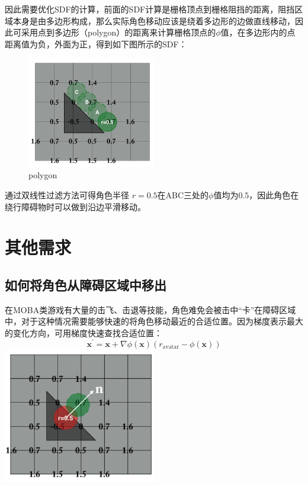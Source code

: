 因此需要优化SDF的计算，前面的SDF计算是栅格顶点到栅格阻挡的距离，阻挡区域本身是由多边形构成，那么实际角色移动应该是绕着多边形的边做直线移动，因此可采用点到多边形（polygon）的距离来计算栅格顶点的\(\phi\)值，在多边形内的点距离值为负，外面为正，得到如下图所示的SDF：

\begin{figure}
\centering
\includegraphics[width=0.5\textwidth,height=\textheight]{polygon.png}
\caption{polygon}
\end{figure}

通过双线性过滤方法可得角色半径
\(r = 0.5\)在ABC三处的\(\phi\)值均为\(0.5\)，因此角色在绕行障碍物时可以做到沿边平滑移动。

\hypertarget{ux5176ux4ed6ux9700ux6c42}{%
\section{其他需求}\label{ux5176ux4ed6ux9700ux6c42}}

\hypertarget{ux5982ux4f55ux5c06ux89d2ux8272ux4eceux969cux788dux533aux57dfux4e2dux79fbux51fa}{%
\subsection{如何将角色从障碍区域中移出}\label{ux5982ux4f55ux5c06ux89d2ux8272ux4eceux969cux788dux533aux57dfux4e2dux79fbux51fa}}

在MOBA类游戏有大量的击飞、击退等技能，角色难免会被击中``卡''在障碍区域中，对于这种情况需要能够快速的将角色移动最近的合适位置。因为梯度表示最大的变化方向，可用梯度快速查找合适位置：
\[
\mathbf{x}^\prime = \mathbf{x} + \nabla\phi(\mathbf{x})\left(r_\text{avatar}-\phi(\mathbf{x})\right)
\]
\includegraphics[width=0.5\textwidth,height=\textheight]{查找合适位置示意图.png}

